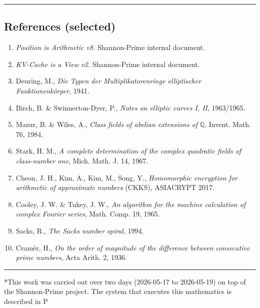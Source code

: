 \documentclass[
  11pt,
]{article}
\providecommand{\tightlist}{%
  \setlength{\itemsep}{0pt}\setlength{\parskip}{0pt}}
\begin{document}
\begin{center}\rule{0.5\linewidth}{0.5pt}\end{center}

\hypertarget{references-selected}{%
\subsection{References (selected)}\label{references-selected}}

\begin{enumerate}
\def\labelenumi{\arabic{enumi}.}
\tightlist
\item
  \emph{Position is Arithmetic v8.} Shannon-Prime internal document.
\item
  \emph{KV-Cache is a View v2.} Shannon-Prime internal document.
\item
  Deuring, M., \emph{Die Typen der Multiplikatorenringe elliptischer
  Funktionenkörper}, 1941.
\item
  Birch, B. \& Swinnerton-Dyer, P., \emph{Notes on elliptic curves I,
  II}, 1963/1965.
\item
  Mazur, B. \& Wiles, A., \emph{Class fields of abelian extensions of
  \(\mathbb{Q}\)}, Invent. Math. 76, 1984.
\item
  Stark, H. M., \emph{A complete determination of the complex quadratic
  fields of class-number one}, Mich. Math. J. 14, 1967.
\item
  Cheon, J. H., Kim, A., Kim, M., Song, Y., \emph{Homomorphic encryption
  for arithmetic of approximate numbers} (CKKS), ASIACRYPT 2017.
\item
  Cooley, J. W. \& Tukey, J. W., \emph{An algorithm for the machine
  calculation of complex Fourier series}, Math. Comp. 19, 1965.
\item
  Sacks, R., \emph{The Sacks number spiral}, 1994.
\item
  Cramér, H., \emph{On the order of magnitude of the difference between
  consecutive prime numbers}, Acta Arith. 2, 1936.
\end{enumerate}

\begin{center}\rule{0.5\linewidth}{0.5pt}\end{center}

*This work was carried out over two days (2026-05-17 to 2026-05-19) on
top of the Shannon-Prime project. The system that executes this
mathematics is described in P
\end{document}
